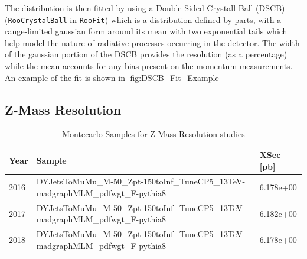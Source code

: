 The distribution is then fitted by using a Double-Sided Crystall Ball (DSCB)
(\verb|RooCrystalBall| in \verb|RooFit|) which is a distribution defined
by parts, with a range-limited gaussian form around its mean with two
exponential tails which help model the nature of radiative processes occurring in
the detector. The width of the gaussian portion of the DSCB provides the
resolution (as a percentage) while the mean accounts for any bias present on the
momentum measurements. An example of the fit is shown in \ref{fig:DSCB_Fit_Example}

\subsection{Z-Mass Resolution}

\begin{table}
\begin{center}
  \caption{Montecarlo Samples for Z Mass Resolution studies}
\footnotesize
\begin{tabular}{|l|l|l|}
\hline
Year & Sample & XSec [pb] \\ \hline
\hline
2016 & DYJetsToMuMu\_M-50\_Zpt-150toInf\_TuneCP5\_13TeV-madgraphMLM\_pdfwgt\_F-pythia8 & 6.178e+00\\
\hline
2017 & DYJetsToMuMu\_M-50\_Zpt-150toInf\_TuneCP5\_13TeV-madgraphMLM\_pdfwgt\_F-pythia8 & 6.182e+00\\
\hline
2018 & DYJetsToMuMu\_M-50\_Zpt-150toInf\_TuneCP5\_13TeV-madgraphMLM\_pdfwgt\_F-pythia8 & 6.178e+00\\
\hline
\end{tabular}
\label{tab:ZMassResolutionSamples}
\end{center}
\end{table}
